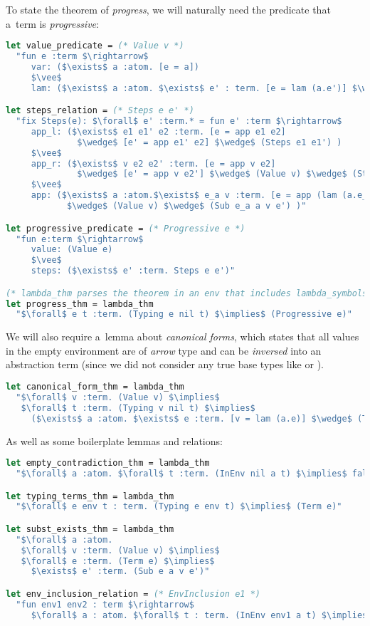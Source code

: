 \documentclass[english, mgr]{iithesis}
\newcommand{\lstt}[1]{\text{{\lstinline[columns=fixed,mathescape]|#1|}}}
\renewcommand{\it}[1]{\textit{#1}}
\begin{document}
To state the theorem of \it{progress}, we will naturally need the predicate
that a~term is \it{progressive}:
\begin{lstlisting}[mathescape,language=OCaml, escapebegin=\color{codepurple}]
let value_predicate = (* Value v *)
  "fun e :term $\rightarrow$
     var: ($\exists$ a :atom. [e = a])
     $\vee$
     lam: ($\exists$ a :atom. $\exists$ e' : term. [e = lam (a.e')] $\wedge$ (Term e'))"

let steps_relation = (* Steps e e' *)
  "fix Steps(e): $\forall$ e' :term.* = fun e' :term $\rightarrow$
     app_l: ($\exists$ e1 e1' e2 :term. [e = app e1 e2]
              $\wedge$ [e' = app e1' e2] $\wedge$ (Steps e1 e1') )
     $\vee$
     app_r: ($\exists$ v e2 e2' :term. [e = app v e2]
              $\wedge$ [e' = app v e2'] $\wedge$ (Value v) $\wedge$ (Steps e2 e2') )
     $\vee$
     app: ($\exists$ a :atom.$\exists$ e_a v :term. [e = app (lam (a.e_a)) v]
            $\wedge$ (Value v) $\wedge$ (Sub e_a a v e') )"

let progressive_predicate = (* Progressive e *)
  "fun e:term $\rightarrow$
     value: (Value e)
     $\vee$
     steps: ($\exists$ e' :term. Steps e e')"

(* lambda_thm parses the theorem in an env that includes lambda_symbols and all lambda predicates and relations *)
let progress_thm = lambda_thm
  "$\forall$ e t :term. (Typing e nil t) $\implies$ (Progressive e)"
\end{lstlisting}
We will also require a~lemma about \it{canonical forms},
which states that all values in the empty environment
are of \it{arrow} type and can be \it{inversed} into an abstraction term
(since we did not consider any true base types like \lstt{Bool} or \lstt{Int}).
\begin{lstlisting}[mathescape,language=OCaml, escapebegin=\color{codepurple}]
let canonical_form_thm = lambda_thm
  "$\forall$ v :term. (Value v) $\implies$
   $\forall$ t :term. (Typing v nil t) $\implies$
     ($\exists$ a :atom. $\exists$ e :term. [v = lam (a.e)] $\wedge$ (Term e))"
\end{lstlisting}
As well as some boilerplate lemmas and relations:
\begin{lstlisting}[mathescape,language=OCaml, escapebegin=\color{codepurple}]
let empty_contradiction_thm = lambda_thm
  "$\forall$ a :atom. $\forall$ t :term. (InEnv nil a t) $\implies$ false"

let typing_terms_thm = lambda_thm
  "$\forall$ e env t : term. (Typing e env t) $\implies$ (Term e)"

let subst_exists_thm = lambda_thm
  "$\forall$ a :atom.
   $\forall$ v :term. (Value v) $\implies$
   $\forall$ e :term. (Term e) $\implies$
     $\exists$ e' :term. (Sub e a v e')"

let env_inclusion_relation = (* EnvInclusion e1 *)
  "fun env1 env2 : term $\rightarrow$
     $\forall$ a : atom. $\forall$ t : term. (InEnv env1 a t) $\implies$ (InEnv env2 a t)"
\end{lstlisting}
\end{document}
